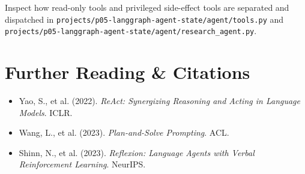 \begin{labbridgebox}
Inspect how read-only tools and privileged side-effect tools are separated and dispatched in \texttt{projects/p05-langgraph-agent-state/agent/tools.py} and \texttt{projects/p05-langgraph-agent-state/agent/research\_agent.py}.
\end{labbridgebox}

\section{Further Reading \protect\& Citations}
\begin{itemize}[leftmargin=18pt]
  \item Yao, S., et al. (2022). \emph{ReAct: Synergizing Reasoning and Acting in Language Models}. ICLR.
  \item Wang, L., et al. (2023). \emph{Plan-and-Solve Prompting}. ACL.
  \item Shinn, N., et al. (2023). \emph{Reflexion: Language Agents with Verbal Reinforcement Learning}. NeurIPS.
\end{itemize}
